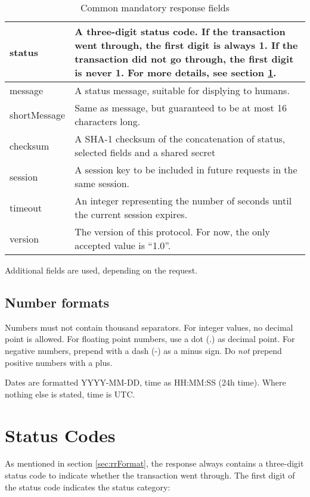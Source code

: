 \documentclass[a4paper,11pt]{article}
\newcommand{\code}[1]
   {\textsf{\mbox{#1}}}
\newcommand{\rightcellwidth}{25em}
\begin{document}
\begin{table}[!ht]
  \begin{tabular}{|l|p{\rightcellwidth}|}
    \hline
    status & A three-digit status code. If the transaction went
       through, the first digit is always 1. If the transaction did not
       go through, the first digit is never 1.
       For more details, see section \ref{sec:statusCodes}.\\\hline
    message & A status message, suitable for displying to humans.\\\hline
    shortMessage & Same as \code{message}, but guaranteed to be at
       most 16 characters long.\\\hline
    checksum & A SHA-1 checksum of the concatenation of status,
      selected fields and a shared secret \\\hline
    session & A session key to be included in future requests in the
      same session.\\\hline
    timeout & An integer representing the number of seconds until the
      current session expires.\\\hline
    version & The version of this protocol. For now, the only accepted
      value is ``1.0''. \\\hline 
  \end{tabular} 
  \caption{Common mandatory response fields}
\end{table}

Additional fields are used, depending on the request.

\subsection{Number formats}
Numbers must not contain thousand separators. For integer values, no
decimal point is allowed. For floating point numbers, use a dot (.) as
decimal point. For negative numbers, prepend with a dash (-) as a
minus sign. Do \emph{not} prepend positive numbers with a plus. 

Dates are formatted YYYY-MM-DD, time as HH:MM:SS (24h time). Where
nothing else is stated, time is UTC.


\section{Status Codes}\label{sec:statusCodes} 

As mentioned in section \ref{sec:rrFormat}, the response always
contains a three-digit status code to indicate whether the transaction went
through. The first digit of the status code indicates the status category:   
\end{document}
